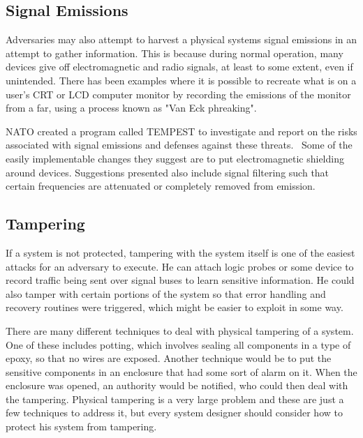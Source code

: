 \subsection{Signal Emissions}
Adversaries may also attempt to harvest a physical systems signal emissions in an attempt to gather information. This is because during
normal operation, many devices give off electromagnetic and radio signals, at least to some extent, even if unintended. There has been
examples where it is possible to recreate what is on a user's CRT or LCD computer monitor by recording the emissions of the monitor
from a far, using a process known as "Van Eck phreaking".~\cite{monitor}~\cite{lcds}

NATO created a program called TEMPEST to investigate and report on the risks associated with signal emissions and defenses
against these threats.~\cite{tempest} Some of the easily implementable changes they suggest are to put electromagnetic shielding
around devices. Suggestions presented also include signal filtering such that certain frequencies are attenuated or completely removed
from emission.

\subsection{Tampering}
If a system is not protected, tampering with the system itself is one of the easiest attacks for an adversary to execute.
He can attach logic probes or some device to record traffic being sent over signal buses to learn sensitive information.
He could also tamper with certain portions of the system so that error handling and recovery routines were triggered,
which might be easier to exploit in some way.

There are many different techniques to deal with physical tampering of a system. One of these includes potting, which 
involves sealing all components in a type of epoxy, so that no wires are exposed. Another technique would be to
put the sensitive components in an enclosure that had some sort of alarm on it. When the enclosure was opened, an
authority would be notified, who could then deal with the tampering. Physical tampering is a very large problem
and these are just a few techniques to address it, but every system designer should consider how to protect his
system from tampering.
